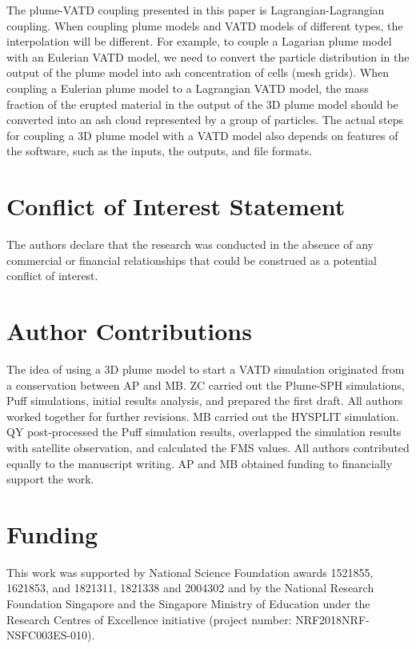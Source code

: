 \documentclass[utf8]{frontiersSCNS} %
\begin{document}
The plume-VATD coupling presented in this paper is Lagrangian-Lagrangian coupling. When coupling plume models and VATD models of different types, the interpolation will be different. For example, to couple a Lagarian plume model with an Eulerian VATD model, we need to convert the particle distribution in the output of the plume model into ash concentration of cells (mesh grids). When coupling a Eulerian plume model to a Lagrangian VATD model, the mass fraction of the erupted material in the output of the 3D plume model should be converted into an ash cloud represented by a group of particles. The actual steps for coupling a 3D plume model with a VATD model also depends on features of the software, such as the inputs, the outputs, and file formats.

\section*{Conflict of Interest Statement}

The authors declare that the research was conducted in the absence of any commercial or financial relationships that could be construed as a potential conflict of interest.

\section*{Author Contributions}
The idea of using a 3D plume model to start a VATD simulation originated from a conservation between AP and MB. ZC carried out the Plume-SPH simulations, Puff simulations, initial results analysis, and prepared the first draft. All authors worked together for further revisions.  MB carried out the HYSPLIT simulation. QY post-processed the Puff simulation results, overlapped the simulation results with satellite observation, and calculated the FMS values. All authors contributed equally to the manuscript writing. AP and MB obtained funding to financially support the work.

\section*{Funding}
This work was supported by National Science Foundation awards 1521855, 1621853, and 1821311, 1821338  and 2004302 and by the National Research Foundation Singapore and the Singapore Ministry of Education under the Research Centres of Excellence initiative (project number: NRF2018NRF-NSFC003ES-010). 
\end{document}
